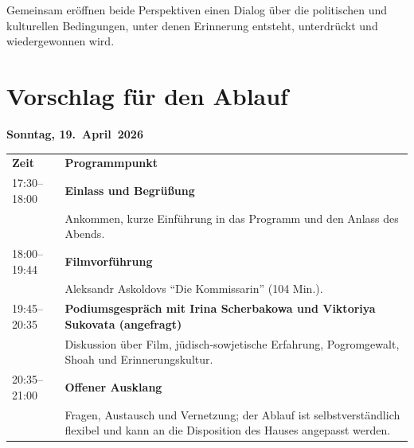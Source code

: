 \documentclass[11pt,a4paper]{article}
\begin{document}
Gemeinsam er\"offnen beide Perspektiven einen Dialog \"uber die politischen und kulturellen Bedingungen, unter denen Erinnerung entsteht, unterdr\"uckt und wiedergewonnen wird.

\section*{Vorschlag f\"ur den Ablauf}

\noindent\textbf{Sonntag, 19.~April~2026}

\small
\renewcommand{\arraystretch}{1.08}
\begin{tabularx}{\textwidth}{@{}p{3.1cm}X@{}}
\textbf{Zeit} & \textbf{Programmpunkt} \\
17:30--18:00 & \textbf{Einlass und Begr\"u{\ss}ung}\\
& Ankommen, kurze Einf\"uhrung in das Programm und den Anlass des Abends. \\
18:00--19:44 & \textbf{Filmvorf\"uhrung}\\
& Aleksandr Askoldovs \enquote{Die Kommissarin} (104 Min.). \\
19:45--20:35 & \textbf{Podiumsgespr\"ach mit Irina Scherbakowa und Viktoriya Sukovata (angefragt)}\\
& Diskussion \"uber Film, j\"udisch-sowjetische Erfahrung, Pogromgewalt, Shoah und Erinnerungskultur. \\
20:35--21:00 & \textbf{Offener Ausklang}\\
& Fragen, Austausch und Vernetzung; der Ablauf ist selbstverst\"andlich flexibel und kann an die Disposition des Hauses angepasst werden. \\
\end{tabularx}
\end{document}
